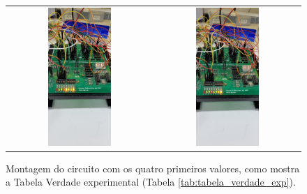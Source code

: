 \documentclass[a4,12pt]{horizon-theme}
\begin{document}
\begin{figure}[!ht]
\begin{tabular}{cc}
    \includegraphics[width=0.45\textwidth, trim={0 18cm 0 7cm}, clip]{circ_3.jpg} & \includegraphics[width=0.45\textwidth, trim={0 18cm 0 7cm}, clip]{circ_4.jpg}
  \end{tabular}
  \caption{Montagem do circuito com os quatro primeiros valores, como mostra a Tabela Verdade experimental (Tabela \ref{tab:tabela_verdade_exp}).}
  \label{fig:montagem}
\end{figure}

\horizonBackCover
\end{document}
